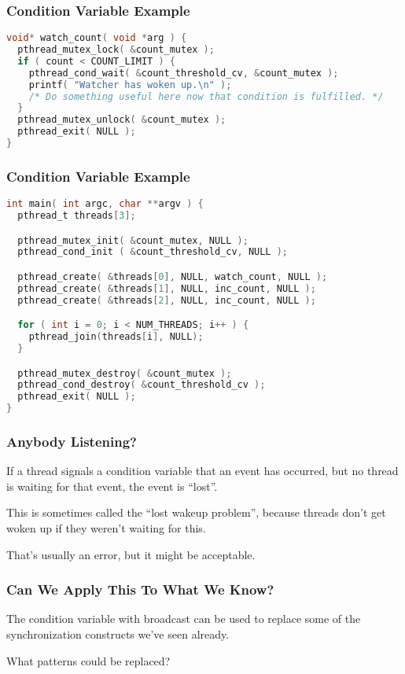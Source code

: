 \begin{frame}[fragile]
	\frametitle{Condition Variable Example}

	\begin{lstlisting}[language=C]
void* watch_count( void *arg ) {
  pthread_mutex_lock( &count_mutex );
  if ( count < COUNT_LIMIT ) {
    pthread_cond_wait( &count_threshold_cv, &count_mutex );
    printf( "Watcher has woken up.\n" );
    /* Do something useful here now that condition is fulfilled. */
  }
  pthread_mutex_unlock( &count_mutex );
  pthread_exit( NULL );
}
\end{lstlisting}
\end{frame}

\begin{frame}[fragile]
	\frametitle{Condition Variable Example}
	\begin{lstlisting}[language=C]
int main( int argc, char **argv ) {
  pthread_t threads[3];

  pthread_mutex_init( &count_mutex, NULL );
  pthread_cond_init ( &count_threshold_cv, NULL );

  pthread_create( &threads[0], NULL, watch_count, NULL );
  pthread_create( &threads[1], NULL, inc_count, NULL );
  pthread_create( &threads[2], NULL, inc_count, NULL );

  for ( int i = 0; i < NUM_THREADS; i++ ) {
    pthread_join(threads[i], NULL);
  }

  pthread_mutex_destroy( &count_mutex );
  pthread_cond_destroy( &count_threshold_cv );
  pthread_exit( NULL );
}
\end{lstlisting}
\end{frame}


\begin{frame}
	\frametitle{Anybody Listening?}

	If a thread signals a condition variable that an event has occurred, but no thread is waiting for that event, the event is ``lost''.

	This is sometimes called the ``lost wakeup problem'', because threads don't get woken up if they weren't waiting for this.

	That's usually an error, but it might be acceptable.

\end{frame}

\begin{frame}
	\frametitle{Can We Apply This To What We Know?}

	The condition variable with broadcast can be used to replace some of the synchronization constructs we've seen already.

	What patterns could be replaced?

\end{frame}


